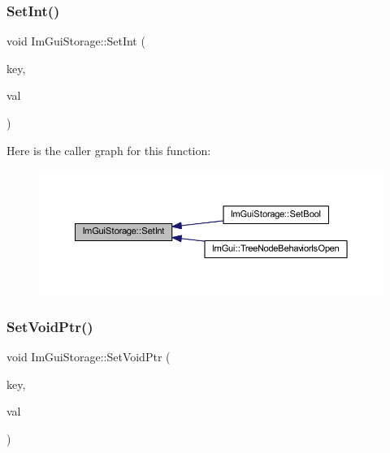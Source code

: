 \mbox{\label{struct_im_gui_storage_af83975ca841a9bd0e06a6ea0a41bf159}} 
\subsubsection{\texorpdfstring{Set\+Int()}{SetInt()}}
{\footnotesize\ttfamily void Im\+Gui\+Storage\+::\+Set\+Int (\begin{DoxyParamCaption}\item[{\mbox{\hyperlink{imgui_8h_a1785c9b6f4e16406764a85f32582236f}{Im\+Gui\+ID}}}]{key,  }\item[{int}]{val }\end{DoxyParamCaption})}

Here is the caller graph for this function\+:
\nopagebreak
\begin{figure}[H]
\begin{center}
\leavevmode
\includegraphics[width=350pt]{struct_im_gui_storage_af83975ca841a9bd0e06a6ea0a41bf159_icgraph}
\end{center}
\end{figure}
\mbox{\label{struct_im_gui_storage_a55f840086b3ec9cf63c67f02d159204a}} 
\subsubsection{\texorpdfstring{Set\+Void\+Ptr()}{SetVoidPtr()}}
{\footnotesize\ttfamily void Im\+Gui\+Storage\+::\+Set\+Void\+Ptr (\begin{DoxyParamCaption}\item[{\mbox{\hyperlink{imgui_8h_a1785c9b6f4e16406764a85f32582236f}{Im\+Gui\+ID}}}]{key,  }\item[{void $\ast$}]{val }\end{DoxyParamCaption})}



